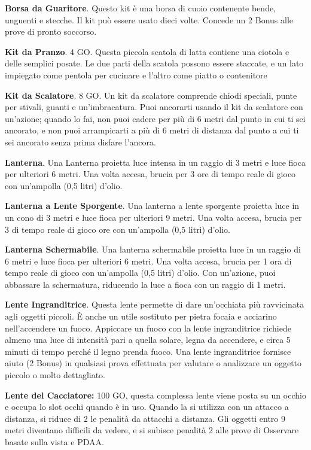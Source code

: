 \documentclass[12pt,a4paper,twoside,openany]{book}
\begin{document}
\begin{multicols}{2}
\textbf{Borsa da Guaritore}. Questo kit è una borsa di cuoio contenente bende, unguenti e stecche. Il kit può essere usato dieci volte. Concede un 2 Bonus alle prove di pronto soccorso.

\textbf{Kit da Pranzo}. 4 GO. Questa piccola scatola di latta contiene una ciotola e delle semplici posate. Le due parti della scatola possono essere staccate, e un lato impiegato come pentola per cucinare e l’altro come piatto o contenitore

\textbf{Kit da Scalatore}. 8 GO. Un kit da scalatore comprende chiodi speciali, punte per stivali, guanti e un’imbracatura. Puoi ancorarti usando il kit da scalatore con un’azione; quando lo fai, non puoi cadere per più di 6 metri dal punto in cui ti sei ancorato, e non puoi arrampicarti a più di 6 metri di distanza dal punto a cui ti sei ancorato senza prima disfare l’ancora.

\textbf{Lanterna}. Una Lanterna proietta luce intensa in un raggio di 3 metri e luce fioca per ulteriori 6 metri. Una volta accesa, brucia per 3 ore di tempo reale di gioco con un’ampolla (0,5 litri) d’olio.

\textbf{Lanterna a Lente Sporgente}. Una lanterna a lente sporgente proietta luce in un cono di 3 metri e luce fioca per ulteriori 9 metri. Una volta accesa, brucia per 3 di tempo reale di gioco ore con un’ampolla (0,5 litri) d’olio.

\textbf{Lanterna Schermabile}. Una lanterna schermabile proietta luce in un raggio di 6 metri e luce fioca per ulteriori 6 metri. Una volta accesa, brucia per 1 ora di tempo reale di gioco con un’ampolla (0,5 litri) d’olio. Con un’azione, puoi abbassare la schermatura, riducendo la luce a fioca con un raggio di 1 metri.

\textbf{Lente Ingranditrice}. Questa lente permette di dare un’occhiata più ravvicinata agli oggetti piccoli. È anche un utile sostituto per pietra focaia e acciarino nell’accendere un fuoco. Appiccare un fuoco con la lente ingranditrice richiede almeno una luce di intensità pari a quella solare, legna da accendere, e circa 5 minuti di tempo perché il legno prenda fuoco. Una lente ingranditrice fornisce aiuto (2 Bonus) in qualsiasi prova effettuata per valutare o analizzare un oggetto piccolo o molto dettagliato. 

\textbf{Lente del Cacciatore:} 100 GO, questa complessa lente viene posta su un occhio e occupa lo slot occhi quando è in uso. Quando la si utilizza con un attacco a distanza, si riduce di 2 le penalità da attacchi a distanza. Gli oggetti entro 9 metri diventano difficili da vedere, e si subisce penalità 2 alle prove di Osservare basate sulla vista e PDAA.


\end{multicols}
\end{document}
